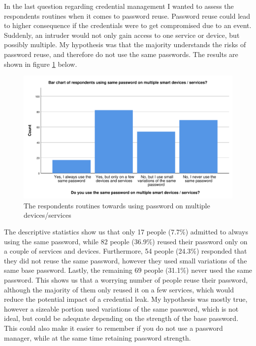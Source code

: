 In the last question regarding credential management I wanted to assess the respondents routines when it comes to password reuse. Password reuse could lead to higher consequence if the credentials were to get compromised due to an event. Suddenly, an intruder would not only gain access to one service or device, but possibly multiple. My hypothesis was that the majority understands the risks of password reuse, and therefore do not use the same passwords. The results are shown in figure \ref{fig:password_reuse} below. 
\begin{figure}[!h]
    \centering
    \includegraphics[scale=0.55]{figures/diagrams/password_reuse.pdf}
    \caption{The respondents routines towards using password on multiple devices/services}
    \label{fig:password_reuse}
\end{figure}
The descriptive statistics show us that only 17 people (7.7\%) admitted to always using the same password, while 82 people (36.9\%) reused their password only on a couple of services and devices. Furthermore, 54 people (24.3\%) responded that they did not reuse the same password, however they used small variations of the same base password. Lastly, the remaining 69 people (31.1\%) never used the same password. This shows us that a worrying number of people reuse their password, although the majority of them only reused it on a few services, which would reduce the potential impact of a credential leak. My hypothesis was mostly true, however a sizeable portion used variations of the same password, which is not ideal, but could be adequate depending on the strength of the base password. This could also make it easier to remember if you do not use a password manager, while at the same time retaining password strength. 

